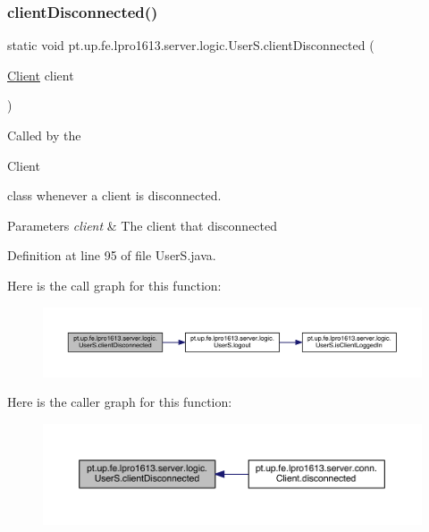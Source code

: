\subsubsection{\texorpdfstring{client\+Disconnected()}{clientDisconnected()}}
{\footnotesize\ttfamily static void pt.\+up.\+fe.\+lpro1613.\+server.\+logic.\+User\+S.\+client\+Disconnected (\begin{DoxyParamCaption}\item[{\hyperlink{classpt_1_1up_1_1fe_1_1lpro1613_1_1server_1_1conn_1_1_client}{Client}}]{client }\end{DoxyParamCaption})\hspace{0.3cm}{\ttfamily [static]}}

Called by the
\begin{DoxyCode}
Client 
\end{DoxyCode}
 class whenever a client is disconnected. 
\begin{DoxyParams}{Parameters}
{\em client} & The client that disconnected \\
\hline
\end{DoxyParams}


Definition at line 95 of file User\+S.\+java.

Here is the call graph for this function\+:
\nopagebreak
\begin{figure}[H]
\begin{center}
\leavevmode
\includegraphics[width=350pt]{classpt_1_1up_1_1fe_1_1lpro1613_1_1server_1_1logic_1_1_user_s_afca9c18f164a1006c2411b8e283ec4fb_cgraph}
\end{center}
\end{figure}
Here is the caller graph for this function\+:
\nopagebreak
\begin{figure}[H]
\begin{center}
\leavevmode
\includegraphics[width=350pt]{classpt_1_1up_1_1fe_1_1lpro1613_1_1server_1_1logic_1_1_user_s_afca9c18f164a1006c2411b8e283ec4fb_icgraph}
\end{center}
\end{figure}
\hypertarget{classpt_1_1up_1_1fe_1_1lpro1613_1_1server_1_1logic_1_1_user_s_ac189b4e10d166dd53fb0e135c9565fbc}{}\label{classpt_1_1up_1_1fe_1_1lpro1613_1_1server_1_1logic_1_1_user_s_ac189b4e10d166dd53fb0e135c9565fbc} 

